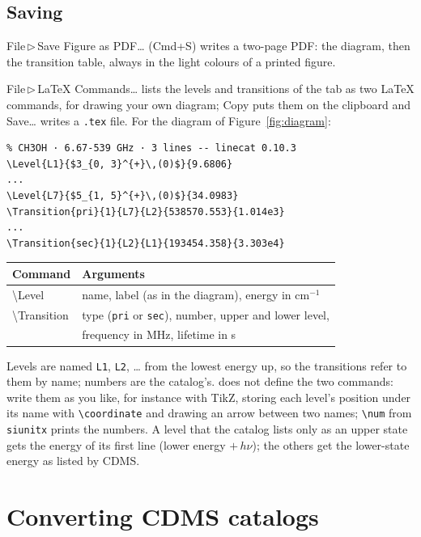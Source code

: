 \documentclass[11pt]{article}
\newcommand{\menu}[1]{\textsf{#1}}
\newcommand{\key}[1]{\textsf{#1}}
\newcommand{\then}{\,$\triangleright$\,}
\begin{document}
\subsection{Saving}
\menu{File\then Save Figure as PDF\dots} (\key{Cmd+S}) writes a two-page PDF: the diagram, then the
transition table, always in the light colours of a printed figure.

\menu{File\then LaTeX Commands\dots} lists the levels and transitions of the tab as two \LaTeX{}
commands, for drawing your own diagram; \menu{Copy} puts them on the clipboard and \menu{Save\dots}
writes a \texttt{.tex} file. For the diagram of Figure~\ref{fig:diagram}:
\begin{verbatim}
% CH3OH · 6.67-539 GHz · 3 lines -- linecat 0.10.3
\Level{L1}{$3_{0, 3}^{+}\,(0)$}{9.6806}
...
\Level{L7}{$5_{1, 5}^{+}\,(0)$}{34.0983}
\Transition{pri}{1}{L7}{L2}{538570.553}{1.014e3}
...
\Transition{sec}{1}{L2}{L1}{193454.358}{3.303e4}
\end{verbatim}
\begin{tabular}{@{}>{\ttfamily}l l@{}}
  \toprule
  \textrm{Command} & Arguments\\
  \midrule
  \textbackslash Level & name, label (as in the diagram), energy in cm$^{-1}$\\
  \textbackslash Transition & type (\texttt{pri} or \texttt{sec}), number, upper and lower level,\\
                            & frequency in MHz, lifetime in s\\
  \bottomrule
\end{tabular}

Levels are named \texttt{L1}, \texttt{L2}, \dots{} from the lowest energy up, so the transitions refer
to them by name; numbers are the catalog's. \AppName{} does not define the two commands: write them as
you like, for instance with TikZ, storing each level's position under its name with
\verb|\coordinate| and drawing an arrow between two names; \verb|\num| from \texttt{siunitx} prints
the numbers. A level that the catalog lists only as an upper state gets the energy of its first line
(lower energy $+\,h\nu$); the others get the lower-state energy as listed by CDMS.

\section{Converting CDMS catalogs}\label{sec:convert}
\end{document}

